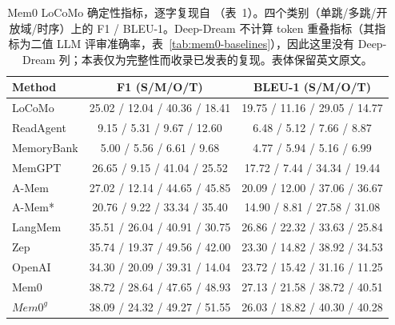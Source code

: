 \begin{table}[t]
\centering
\caption{Mem0 LoCoMo 确定性指标，逐字复现自 \citet{chhikara2025mem0}（表~1）。四个类别（单跳/多跳/开放域/时序）上的 F1 / BLEU-1。Deep-Dream 不计算 token 重叠指标（其指标为二值 LLM 评审准确率，表~\ref{tab:mem0-baselines}），因此这里没有 Deep-Dream 列；本表仅为完整性而收录已发表的复现。表体保留英文原文。}
\label{tab:mem0-f1-bleu}
\footnotesize
\setlength{\tabcolsep}{4pt}
\begin{tabular}{lcc}
\toprule
Method & F1 (S/M/O/T) & BLEU-1 (S/M/O/T) \\
\midrule
LoCoMo & 25.02 / 12.04 / 40.36 / 18.41 & 19.75 / 11.16 / 29.05 / 14.77 \\
ReadAgent & 9.15 / 5.31 / 9.67 / 12.60 & 6.48 / 5.12 / 7.66 / 8.87 \\
MemoryBank & 5.00 / 5.56 / 6.61 / 9.68 & 4.77 / 5.94 / 5.16 / 6.99 \\
MemGPT & 26.65 / 9.15 / 41.04 / 25.52 & 17.72 / 7.44 / 34.34 / 19.44 \\
A-Mem & 27.02 / 12.14 / 44.65 / 45.85 & 20.09 / 12.00 / 37.06 / 36.67 \\
A-Mem* & 20.76 / 9.22 / 33.34 / 35.40 & 14.90 / 8.81 / 27.58 / 31.08 \\
LangMem & 35.51 / 26.04 / 40.91 / 30.75 & 26.86 / 22.32 / 33.63 / 25.84 \\
Zep & 35.74 / 19.37 / 49.56 / 42.00 & 23.30 / 14.82 / 38.92 / 34.53 \\
OpenAI & 34.30 / 20.09 / 39.31 / 14.04 & 23.72 / 15.42 / 31.16 / 11.25 \\
Mem0 & 38.72 / 28.64 / 47.65 / 48.93 & 27.13 / 21.58 / 38.72 / 40.51 \\
$Mem0^g$ & 38.09 / 24.32 / 49.27 / 51.55 & 26.03 / 18.82 / 40.30 / 40.28 \\
\bottomrule
\end{tabular}
\end{table}
